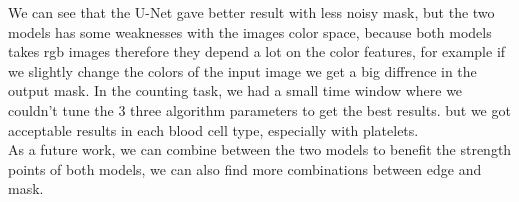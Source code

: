 \documentclass[conference]{IEEEtran}
\begin{document}
We can see that the U-Net gave better result with less noisy mask, but the two models has some weaknesses with the images color space, because both models takes rgb images therefore they depend a lot on the color features, for example if we slightly change the colors of the input image we get a big diffrence in the output mask.
In the counting task, we had a small time window where we couldn't tune the 3 three algorithm parameters to get the best results. but we got acceptable results in each blood cell type, especially with platelets.\\

As a future work, we can combine between the two models to benefit the strength points of both models, we can also find more combinations between edge and mask.



\end{document}
